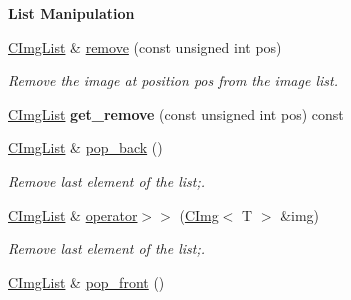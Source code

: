 \begin{Indent}{\bf List Manipulation}
\begin{DoxyCompactItemize}
\item 
\hypertarget{structcimg__library_1_1_c_img_list_a62889566e5960a79df5bc2d7c9a497df}{
\hyperlink{structcimg__library_1_1_c_img_list}{CImgList} \& \hyperlink{structcimg__library_1_1_c_img_list_a62889566e5960a79df5bc2d7c9a497df}{remove} (const unsigned int pos)}
\label{structcimg__library_1_1_c_img_list_a62889566e5960a79df5bc2d7c9a497df}

\begin{DoxyCompactList}\small\item\em Remove the image at position {\ttfamily pos} from the image list. \item\end{DoxyCompactList}\item 
\hypertarget{structcimg__library_1_1_c_img_list_afff4b865fa0601ec7f7dfffccaae1238}{
\hyperlink{structcimg__library_1_1_c_img_list}{CImgList} {\bfseries get\_\-remove} (const unsigned int pos) const }
\label{structcimg__library_1_1_c_img_list_afff4b865fa0601ec7f7dfffccaae1238}

\item 
\hypertarget{structcimg__library_1_1_c_img_list_a8e152920fa1294c225236a233ff37fee}{
\hyperlink{structcimg__library_1_1_c_img_list}{CImgList} \& \hyperlink{structcimg__library_1_1_c_img_list_a8e152920fa1294c225236a233ff37fee}{pop\_\-back} ()}
\label{structcimg__library_1_1_c_img_list_a8e152920fa1294c225236a233ff37fee}

\begin{DoxyCompactList}\small\item\em Remove last element of the list;. \item\end{DoxyCompactList}\item 
\hypertarget{structcimg__library_1_1_c_img_list_a3a0bc81cd8e38e18f3de9b24f4f8419f}{
\hyperlink{structcimg__library_1_1_c_img_list}{CImgList} \& \hyperlink{structcimg__library_1_1_c_img_list_a3a0bc81cd8e38e18f3de9b24f4f8419f}{operator$>$$>$} (\hyperlink{structcimg__library_1_1_c_img}{CImg}$<$ T $>$ \&img)}
\label{structcimg__library_1_1_c_img_list_a3a0bc81cd8e38e18f3de9b24f4f8419f}

\begin{DoxyCompactList}\small\item\em Remove last element of the list;. \item\end{DoxyCompactList}\item 
\hypertarget{structcimg__library_1_1_c_img_list_a8450a9d39177a13dd1a36460ea7cbda6}{
\hyperlink{structcimg__library_1_1_c_img_list}{CImgList} \& \hyperlink{structcimg__library_1_1_c_img_list_a8450a9d39177a13dd1a36460ea7cbda6}{pop\_\-front} ()}
\label{structcimg__library_1_1_c_img_list_a8450a9d39177a13dd1a36460ea7cbda6}


\end{DoxyCompactItemize}
\end{Indent}
